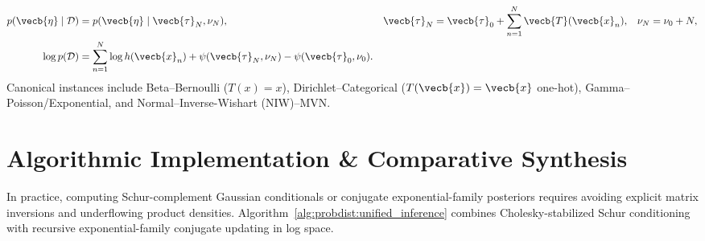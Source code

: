 \documentclass[../../../../master.tex]{subfiles}
\begin{document}
\begin{coremath}
\begin{align}\label{eq:probdist:conjugate_update}
  p(\vecb{\eta}\mid\mathcal{D}) &= p(\vecb{\eta}\mid \vecb{\tau}_N, \nu_N), &
  \vecb{\tau}_N &= \vecb{\tau}_0 + \sum_{n=1}^N \vecb{T}(\vecb{x}_n), &
  \nu_N &= \nu_0 + N, \\
  \log p(\mathcal{D}) &= \sum_{n=1}^N \log h(\vecb{x}_n) + \psi(\vecb{\tau}_N, \nu_N) - \psi(\vecb{\tau}_0, \nu_0). \nonumber
\end{align}
Canonical instances include Beta--Bernoulli ($T(x)=x$), Dirichlet--Categorical ($T(\vecb{x})=\vecb{x}$ one-hot), Gamma--Poisson/Exponential, and Normal--Inverse-Wishart (NIW)--MVN.
\end{coremath}

\section{Algorithmic Implementation \& Comparative Synthesis}\label{sec:probdist:algorithms}

In practice, computing Schur-complement Gaussian conditionals or conjugate exponential-family posteriors requires avoiding explicit matrix inversions and underflowing product densities. Algorithm~\ref{alg:probdist:unified_inference} combines Cholesky-stabilized Schur conditioning with recursive exponential-family conjugate updating in log space.
\end{document}
